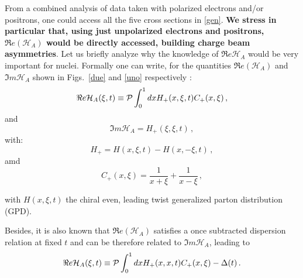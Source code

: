 \documentclass[times, twoside]{PosWhiPap}
\begin{document}
From a combined analysis of data taken with polarized electrons and/or 
positrons, one could access all the five cross sections in \eqref{gen}.
{\bf We stress in particular that, using just unpolarized electrons and positrons, $\Re 
e(\mathcal{H}_{A})$ would be directly accessed, building charge beam asymmetries}. Let us briefly 
analyze why the knowledge of $\Re e\mathcal{H}_{A}$ would be very
important for nuclei. Formally one can write,
for the quantities $\Re e(\mathcal{H}_{A})$ and $\Im m \mathcal{H}_{A}$
shown in Figs.~\ref{due} and \ref{uno} respectively \cite{Guidal:2013rya}:
\begin{equation}
\Re e \mathcal{H}_{A} (\xi,t) \equiv 
{\cal P} \int_0^1 dx H_+(x,\xi,t) C_+(x,\xi) \, ,
\label{ReC}
\end{equation}
and
\begin{equation}
  \Im m \mathcal{H}_{A} = H_+(\xi,\xi,t)  \, ,
\end{equation}
with:
\begin{equation}
    H_+ = H(x,\xi,t)-H(x,-\xi,t) \, ,
\end{equation}
amd
\begin{equation}
    C_+(x,\xi) = \frac{1}{x+\xi}+\frac{1}{x-\xi} \, ,
\end{equation}

with $H(x,\xi,t)$ the chiral even, leading twist generalized parton distribution
(GPD).


Besides, it is also known that $\Re e(\mathcal{H}_{A})$ satisfies a once 
subtracted dispersion relation at fixed $t$ and can be therefore related
to $\Im m \mathcal{H}_{A}$, leading to 
\cite{Anikin:2007yh,Diehl:2007jb,Radyushkin:2011dh,Pasquini:2014vua}
\begin{equation}
\Re e \mathcal{H}_{A} (\xi,t) \equiv
{\cal P} \int_0^1 dx H_+(x,x,t) C_+(x,\xi)
- \Delta(t) \, .
\label{disp}
\end{equation}
\end{document}
